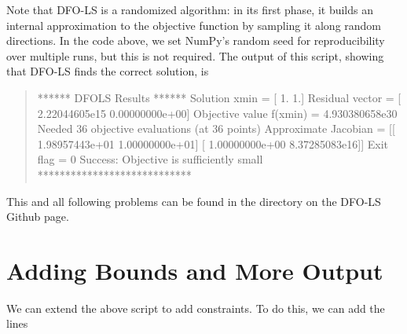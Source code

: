 \documentclass[letterpaper,10pt,english]{sphinxmanual}
\begin{document}
Note that DFO-LS is a randomized algorithm: in its first phase, it builds an internal approximation to the objective function by sampling it along random directions. In the code above, we set NumPy’s random seed for reproducibility over multiple runs, but this is not required. The output of this script, showing that DFO-LS finds the correct solution, is
\begin{quote}

\begin{sphinxVerbatim}[commandchars=\\\{\}]
****** DFO\PYGZhy{}LS Results ******
Solution xmin = [ 1.  1.]
Residual vector = [ \PYGZhy{}2.22044605e\PYGZhy{}15   0.00000000e+00]
Objective value f(xmin) = 4.930380658e\PYGZhy{}30
Needed 36 objective evaluations (at 36 points)
Approximate Jacobian = [[ \PYGZhy{}1.98957443e+01   1.00000000e+01]
 [ \PYGZhy{}1.00000000e+00   8.37285083e\PYGZhy{}16]]
Exit flag = 0
Success: Objective is sufficiently small
****************************
\end{sphinxVerbatim}
\end{quote}

This and all following problems can be found in the  directory on the DFO-LS Github page.


\section{Adding Bounds and More Output}
\label{\detokenize{userguide:adding-bounds-and-more-output}}
We can extend the above script to add constraints. To do this, we can add the lines
\begin{quote}

\begin{sphinxVerbatim}[commandchars=\\\{\}]
  \PYG{p}{[} \PYG{p}{]}
  \PYG{p}{[} \PYG{p}{]}

     
\end{sphinxVerbatim}
\end{quote}
\end{document}
